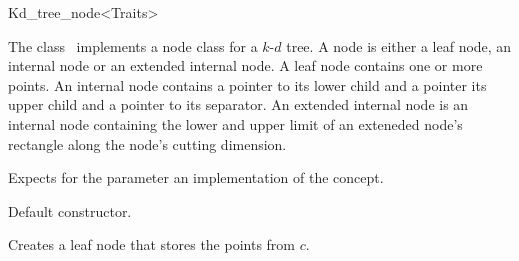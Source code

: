 

\begin{ccRefClass}{Kd_tree_node<Traits>}  %


\begin{ccAdvanced}

\ccDefinition
  
The class \ccRefName\ implements a node class for a $k$-$d$ tree. 
A node is either a leaf node, an internal node or an extended internal node.
A leaf node contains one or more points. An internal node contains a pointer
to its lower child and a pointer its upper child and a pointer to its separator.
An extended internal node is an internal node containing the lower and 
upper limit of an exteneded node's rectangle
along the node's cutting dimension.



Expects for the parameter  an implementation
of the 
concept.

\ccTypes



\ccCreation
{}  %

 {Default constructor.}

{
Creates a leaf node  that stores the points from $c$.
}


\end{ccAdvanced}
\end{ccRefClass}

